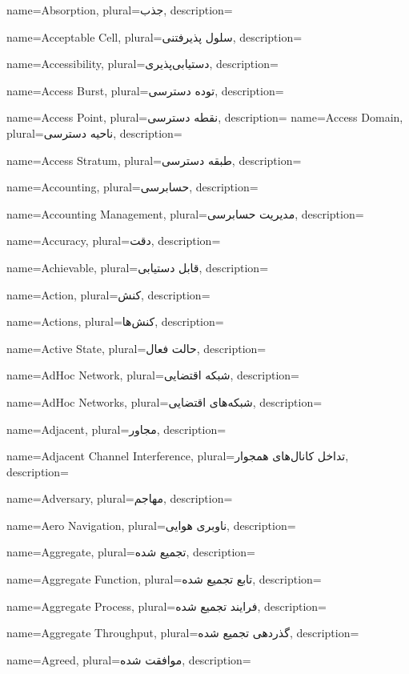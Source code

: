 

{name={Absorption}, 
plural={جذب},
description={}
}

{name={Acceptable Cell}, 
plural={سلول پذیرفتنی},
description={}
}

{name={Accessibility}, 
plural={دستیابی‌پذیری},
description={}
}

{name={Access Burst}, 
plural={توده دسترسی},
description={}
}

{name={Access Point}, 
plural={نقطه دسترسی},
description={}
}
{name={Access Domain}, 
plural={ناحیه دسترسی},
description={}
}

{name={Access Stratum}, 
plural={طبقه دسترسی},
description={}
}

{name={Accounting}, 
plural={حسابرسی},
description={}
}

{name={Accounting Management}, 
plural={مدیریت حسابرسی},
description={}
}

{name={Accuracy}, 
plural={دقت},
description={}
}

{name={Achievable}, 
plural={قابل دستیابی},
description={}
}

{name={Action}, 
plural={کنش},
description={}
}

{name={Actions}, 
plural={کنش‌ها},
description={}
}

{name={Active State}, 
plural={حالت فعال},
description={}
}

{name={AdHoc Network}, 
plural={شبکه اقتضایی},
description={}
}

{name={AdHoc Networks}, 
plural={شبکه‌های اقتضایی},
description={}
}

{name={Adjacent}, 
plural={مجاور},
description={}
}

{name={Adjacent Channel Interference}, 
plural={تداخل کانال‌های همجوار},
description={}
}

{name={Adversary}, 
plural={مهاجم},
description={}
}

{name={Aero Navigation}, 
plural={ناوبری هوایی},
description={}
}

{name={Aggregate}, 
plural={تجمیع شده},
description={}
}

{name={Aggregate Function}, 
plural={تابع تجمیع شده},
description={}
}

{name={Aggregate Process}, 
plural={فرایند تجمیع شده},
description={}
}

{name={Aggregate Throughput}, 
plural={گذردهی تجمیع شده},
description={}
}

{name={Agreed}, 
plural={موافقت شده},
description={}
}
